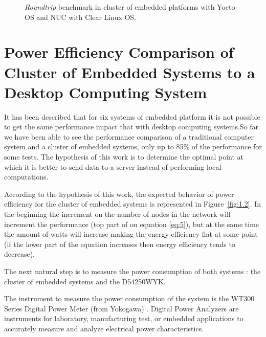\begin{figure}[H]
\begin{center}
\end{center}
\caption{\textit{Roundtrip} benchmark in cluster of embedded platforms with Yocto OS and NUC
with Clear Linux OS.}
\label{roundtrip_cluster}
\end{figure}

\section{Power Efficiency Comparison of Cluster of Embedded Systems to a
Desktop Computing System}

It has been described that for six systems of embedded platform it is not
possible to get the same performance impact that with desktop computing
systems.So far we have been able to see the performance comparison of a traditional
computer system and a cluster of embedded systems, only up to 85\% of the
performance for some tests. The hypothesis of this work is to determine the
optimal point at which it is better to send data to a server instead of
performing local computations.


According to the hypothesis of this work, the expected behavior of power
efficiency for the cluster of embedded systems is represented in
Figure~\ref{fig:1.2}. In the beginning the increment on the
number of nodes in the network will increment the performance (top part of
on equation \ref{eq:5}), but at the same time the amount of watts will
increase making the energy efficiency flat at some point (if the lower part of
the equation increases then energy efficiency tends to decrease).

The next natural step is to measure the power consumption of both systems : the
cluster of embedded systems and the D54250WYK.

The instrument to measure the power consumption of the system is the WT300
Series Digital Power Meter (from Yokogawa) . Digital Power Analyzers are
instruments for laboratory, manufacturing test, or embedded applications to
accurately measure and analyze electrical power characteristics.

